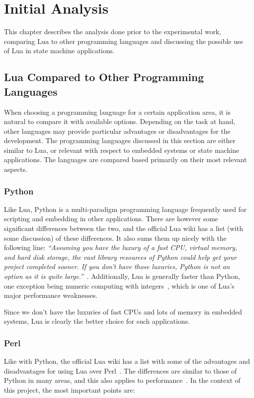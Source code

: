\chapter{Initial Analysis}
\label{ch:initial_analysis}
This chapter describes the analysis done prior to the experimental work, comparing Lua to other programming languages and discussing the possible use of Lua in state machine applications.

\section{Lua Compared to Other Programming Languages}
\label{sec:lua_compared}
When choosing a programming language for a certain application area, it is natural to compare it with available options. Depending on the task at hand, other languages may provide particular advantages or disadvantages for the development. The programming languages discussed in this section are either similar to Lua, or relevant with respect to embedded systems or state machine applications. The languages are compared based primarily on their most relevant aspects.

\subsection{Python}
\label{sec:lua_vs_python}
Like Lua, Python is a multi-paradigm programming language frequently used for scripting and embedding in other applications. There are however some significant differences between the two, and the official Lua wiki has a list (with some discussion) of these differences. It also sums them up nicely with the following line: \emph{``Assuming you have the luxury of a fast CPU, virtual memory, and hard disk storage, the vast library resources of Python could help get your project completed sooner. If you don't have those luxuries, Python is not an option as it is quite large.''}~\cite{website:lua_wiki_python}. Additionally, Lua is generally faster than Python, one exception being numeric computing with integers~\cite{website:lua_perl_python_vs}, which is one of Lua's major performance weaknesses.

\noindent
Since we don't have the luxuries of fast CPUs and lots of memory in embedded systems, Lua is clearly the better choice for such applications.

\subsection{Perl}
\label{sec:lua_vs_perl}
Like with Python, the official Lua wiki has a list with some of the advantages and disadvantages for using Lua over Perl~\cite{website:lua_wiki_perl}. The differences are similar to those of Python in many areas, and this also applies to performance~\cite{website:lua_perl_python_vs}. In the context of this project, the most important points are:

